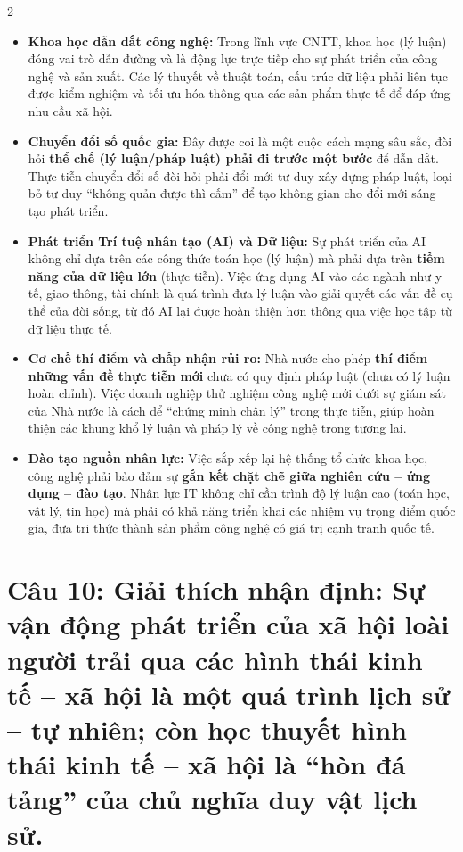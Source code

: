 \documentclass[9pt,a4paper]{extarticle}
\begin{document}
\begin{multicols*}{2}
\begin{itemize}
\item \textbf{Khoa học dẫn dắt công nghệ:} Trong lĩnh vực CNTT, khoa học (lý luận) đóng vai trò dẫn đường và là động lực trực tiếp cho sự phát triển của công nghệ và sản xuất. Các lý thuyết về thuật toán, cấu trúc dữ liệu phải liên tục được kiểm nghiệm và tối ưu hóa thông qua các sản phẩm thực tế để đáp ứng nhu cầu xã hội.
\item \textbf{Chuyển đổi số quốc gia:} Đây được coi là một cuộc cách mạng sâu sắc, đòi hỏi \textbf{thể chế (lý luận/pháp luật) phải đi trước một bước} để dẫn dắt. Thực tiễn chuyển đổi số đòi hỏi phải đổi mới tư duy xây dựng pháp luật, loại bỏ tư duy ``không quản được thì cấm'' để tạo không gian cho đổi mới sáng tạo phát triển.
\item \textbf{Phát triển Trí tuệ nhân tạo (AI) và Dữ liệu:} Sự phát triển của AI không chỉ dựa trên các công thức toán học (lý luận) mà phải dựa trên \textbf{tiềm năng của dữ liệu lớn} (thực tiễn). Việc ứng dụng AI vào các ngành như y tế, giao thông, tài chính là quá trình đưa lý luận vào giải quyết các vấn đề cụ thể của đời sống, từ đó AI lại được hoàn thiện hơn thông qua việc học tập từ dữ liệu thực tế.
\item \textbf{Cơ chế thí điểm và chấp nhận rủi ro:} Nhà nước cho phép \textbf{thí điểm những vấn đề thực tiễn mới} chưa có quy định pháp luật (chưa có lý luận hoàn chỉnh). Việc doanh nghiệp thử nghiệm công nghệ mới dưới sự giám sát của Nhà nước là cách để ``chứng minh chân lý'' trong thực tiễn, giúp hoàn thiện các khung khổ lý luận và pháp lý về công nghệ trong tương lai.
\item \textbf{Đào tạo nguồn nhân lực:} Việc sắp xếp lại hệ thống tổ chức khoa học, công nghệ phải bảo đảm sự \textbf{gắn kết chặt chẽ giữa nghiên cứu -- ứng dụng -- đào tạo}. Nhân lực IT không chỉ cần trình độ lý luận cao (toán học, vật lý, tin học) mà phải có khả năng triển khai các nhiệm vụ trọng điểm quốc gia, đưa tri thức thành sản phẩm công nghệ có giá trị cạnh tranh quốc tế.
\end{itemize}

\section*{Câu 10: Giải thích nhận định: Sự vận động phát triển của xã hội loài người trải qua các hình thái kinh tế -- xã hội là một quá trình lịch sử -- tự nhiên; còn học thuyết hình thái kinh tế -- xã hội là ``hòn đá tảng'' của chủ nghĩa duy vật lịch sử.}


\end{multicols*}
\end{document}
